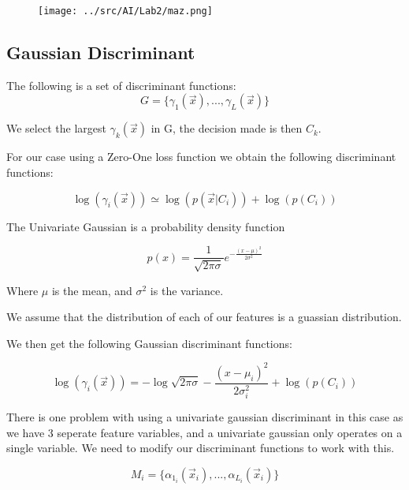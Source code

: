 \documentclass[a4paper]{article}
\begin{document}
\begin{figure}[H]
\begin{center}
\texttt{[image: ../src/AI/Lab2/maz.png]}
\label{plot3}
\end{center}
\end{figure}


\subsection{Gaussian Discriminant} \label{sec:gauss}

The following is a set of discriminant functions:
\begin{equation}
G = \lbrace \gamma_1(\vec x),...,\gamma_L(\vec x) \rbrace
\end{equation}

We select the largest $\gamma_k(\vec x)$ in G, the decision made is
then $C_k$. 

For our case using a Zero-One loss function we obtain the following discriminant functions:

\begin{equation}
\log(\gamma_i(\vec x)) \simeq \log(p(\vec x|C_i)) + \log(p(C_i))
\end{equation}

The Univariate Gaussian is a probability density function

\begin{equation}
p(x) = \frac{1}{\sqrt{2 \pi \sigma}}e^{-\frac{(x - \mu)^2}{2 \sigma^2}}
\end{equation} 

Where $\mu$ is the mean, and $\sigma^2$ is the variance.

We assume that the distribution of each of our features is a
guassian distribution.

We then get the following Gaussian discriminant functions:

\begin{equation}
\log(\gamma_i(\vec x)) = -\log\sqrt{2 \pi \sigma} - \frac{(x - \mu_i)^2}{2 \sigma^2_i} + \log(p(C_i))
\end{equation}

There is one problem with using a univariate gaussian discriminant in this case as we have 3 seperate
feature variables, and a univariate gaussian only operates on a single variable. We need to modify
our discriminant functions to work with this.


\begin{equation}
M_i = \lbrace \alpha_{1_i}(\vec x_i),...,\alpha_{L_i}(\vec x_i) \rbrace
\end{equation}
\end{document}
